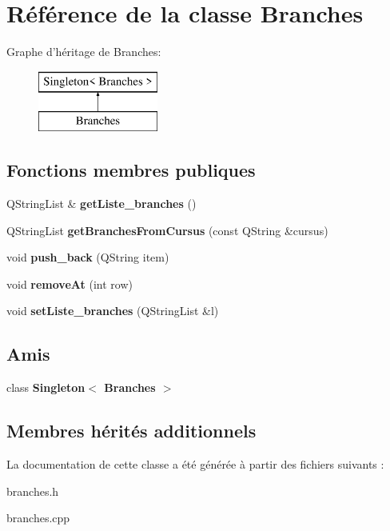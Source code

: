 \hypertarget{class_branches}{\section{Référence de la classe Branches}
\label{class_branches}
}
Graphe d'héritage de Branches\+:\begin{figure}[H]
\begin{center}
\leavevmode
\includegraphics[height=2.000000cm]{class_branches}
\end{center}
\end{figure}
\subsection*{Fonctions membres publiques}
\begin{DoxyCompactItemize}
\item 
\hypertarget{class_branches_a9e69f2be479a387cd4f53bf3816f42b3}{Q\+String\+List \& {\bfseries get\+Liste\+\_\+branches} ()}\label{class_branches_a9e69f2be479a387cd4f53bf3816f42b3}

\item 
\hypertarget{class_branches_a49fdbe17f643c7e4259e9e1fdd6bcb29}{Q\+String\+List {\bfseries get\+Branches\+From\+Cursus} (const Q\+String \&cursus)}\label{class_branches_a49fdbe17f643c7e4259e9e1fdd6bcb29}

\item 
\hypertarget{class_branches_ac262115f02d31604b4449deea5cd3ac9}{void {\bfseries push\+\_\+back} (Q\+String item)}\label{class_branches_ac262115f02d31604b4449deea5cd3ac9}

\item 
\hypertarget{class_branches_accdfc3897bb17a159e0eddb954383bf4}{void {\bfseries remove\+At} (int row)}\label{class_branches_accdfc3897bb17a159e0eddb954383bf4}

\item 
\hypertarget{class_branches_a6b80b177bb7b371cb3f1a5093ea6c034}{void {\bfseries set\+Liste\+\_\+branches} (Q\+String\+List \&l)}\label{class_branches_a6b80b177bb7b371cb3f1a5093ea6c034}

\end{DoxyCompactItemize}
\subsection*{Amis}
\begin{DoxyCompactItemize}
\item 
\hypertarget{class_branches_a742d1f66e36ac560e68852b7180bf5e5}{class {\bfseries Singleton$<$ Branches $>$}}\label{class_branches_a742d1f66e36ac560e68852b7180bf5e5}

\end{DoxyCompactItemize}
\subsection*{Membres hérités additionnels}


La documentation de cette classe a été générée à partir des fichiers suivants \+:\begin{DoxyCompactItemize}
\item 
branches.\+h\item 
branches.\+cpp\end{DoxyCompactItemize}
